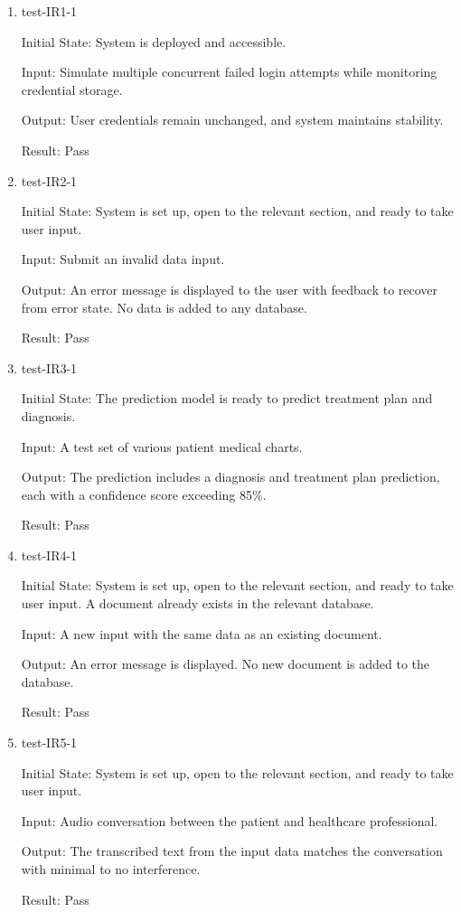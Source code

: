\documentclass[12pt, titlepage]{article}
\begin{document}
\begin{enumerate}

  \item test-IR1-1 \label{test-IR1-1}

  Initial State: System is deployed and accessible.

  Input: Simulate multiple concurrent failed login attempts while monitoring credential storage.

  Output: User credentials remain unchanged, and system maintains stability.

  Result: Pass

  \item test-IR2-1 \label{test-IR2-1}

  Initial State: System is set up, open to the relevant section, and ready to take user input.

  Input: Submit an invalid data input.

  Output: An error message is displayed to the user with feedback to recover from error state. No data is added to any database.

  Result: Pass

  \item test-IR3-1 \label{test-IR3-1}

  Initial State: The prediction model is ready to predict treatment plan and diagnosis.

  Input: A test set of various patient medical charts.

  Output: The prediction includes a diagnosis and treatment plan prediction, each with a confidence score exceeding 85\%.

  Result: Pass

  \item test-IR4-1 \label{test-IR4-1}

  Initial State: System is set up, open to the relevant section, and ready to take user input. A document already exists in the relevant database.

  Input: A new input with the same data as an existing document.

  Output: An error message is displayed. No new document is added to the database.

  Result: Pass

  \item test-IR5-1 \label{test-IR5-1}

  Initial State: System is set up, open to the relevant section, and ready to take user input.

  Input: Audio conversation between the patient and healthcare professional.

  Output: The transcribed text from the input data matches the conversation with minimal to no interference.

  Result: Pass

\end{enumerate}
\end{document}

